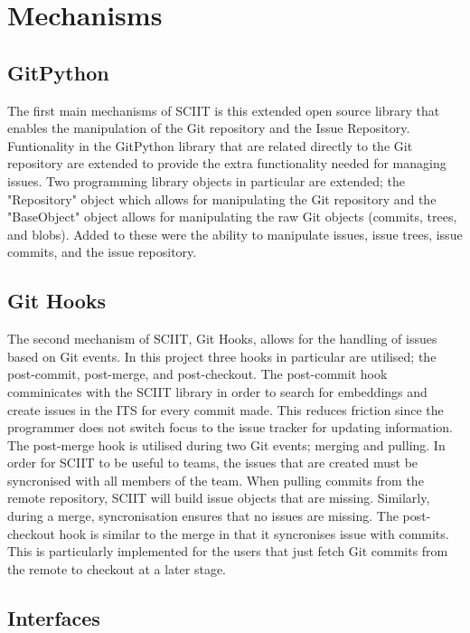 \documentclass{mproj}
\begin{document}
\section{Mechanisms}

\subsection{GitPython}

The first main mechanisms of SCIIT is this extended open source library that enables the manipulation of the Git repository and the Issue Repository. Funtionality in the GitPython library that are related directly to the Git repository are extended to provide the extra functionality needed for managing issues. Two programming library objects in particular are extended; the "Repository" object which allows for manipulating the Git repository and the "BaseObject" object allows for manipulating the raw Git objects (commits, trees, and blobs). Added to these were the ability to manipulate issues, issue trees, issue commits, and the issue repository.


\subsection{Git Hooks}

The second mechanism of SCIIT, Git Hooks, allows for the handling of issues based on Git events. In this project three hooks in particular are utilised; the post-commit, post-merge, and post-checkout. The post-commit hook comminicates with the SCIIT library in order to search for embeddings and create issues in the ITS for every commit made. This reduces friction since the programmer does not switch focus to the issue tracker for updating information. The post-merge hook is utilised during two Git events; merging and pulling. In order for SCIIT to be useful to teams, the issues that are created must be syncronised with all members of the team. When pulling commits from the remote repository, SCIIT will build issue objects that are missing. Similarly, during a merge, syncronisation ensures that no issues are missing. The post-checkout hook is similar to the merge in that it syncronises issue with commits. This is particularly implemented for the users that just fetch Git commits from the remote to checkout at a later stage.

\subsection{Interfaces}
\end{document}
